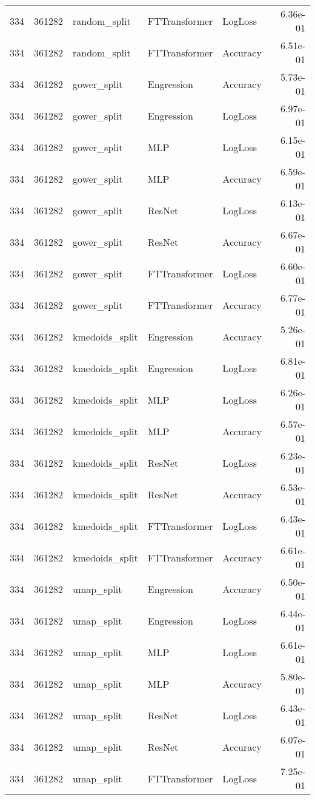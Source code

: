\begin{tabular}{rrlllr}
334 & 361282 & random\_split & FTTransformer & LogLoss & 6.36e-01 \\
334 & 361282 & random\_split & FTTransformer & Accuracy & 6.51e-01 \\
334 & 361282 & gower\_split & Engression & Accuracy & 5.73e-01 \\
334 & 361282 & gower\_split & Engression & LogLoss & 6.97e-01 \\
334 & 361282 & gower\_split & MLP & LogLoss & 6.15e-01 \\
334 & 361282 & gower\_split & MLP & Accuracy & 6.59e-01 \\
334 & 361282 & gower\_split & ResNet & LogLoss & 6.13e-01 \\
334 & 361282 & gower\_split & ResNet & Accuracy & 6.67e-01 \\
334 & 361282 & gower\_split & FTTransformer & LogLoss & 6.60e-01 \\
334 & 361282 & gower\_split & FTTransformer & Accuracy & 6.77e-01 \\
334 & 361282 & kmedoids\_split & Engression & Accuracy & 5.26e-01 \\
334 & 361282 & kmedoids\_split & Engression & LogLoss & 6.81e-01 \\
334 & 361282 & kmedoids\_split & MLP & LogLoss & 6.26e-01 \\
334 & 361282 & kmedoids\_split & MLP & Accuracy & 6.57e-01 \\
334 & 361282 & kmedoids\_split & ResNet & LogLoss & 6.23e-01 \\
334 & 361282 & kmedoids\_split & ResNet & Accuracy & 6.53e-01 \\
334 & 361282 & kmedoids\_split & FTTransformer & LogLoss & 6.43e-01 \\
334 & 361282 & kmedoids\_split & FTTransformer & Accuracy & 6.61e-01 \\
334 & 361282 & umap\_split & Engression & Accuracy & 6.50e-01 \\
334 & 361282 & umap\_split & Engression & LogLoss & 6.44e-01 \\
334 & 361282 & umap\_split & MLP & LogLoss & 6.61e-01 \\
334 & 361282 & umap\_split & MLP & Accuracy & 5.80e-01 \\
334 & 361282 & umap\_split & ResNet & LogLoss & 6.43e-01 \\
334 & 361282 & umap\_split & ResNet & Accuracy & 6.07e-01 \\
334 & 361282 & umap\_split & FTTransformer & LogLoss & 7.25e-01 \\

\end{tabular}
